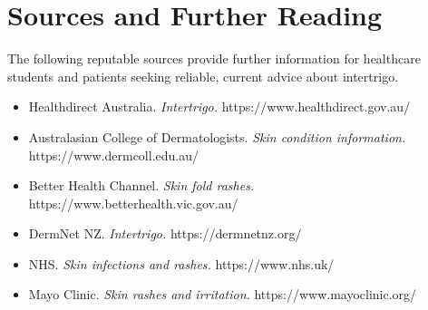 \section*{Sources and Further Reading}
The following reputable sources provide further information for healthcare students and patients seeking reliable, current advice about intertrigo.
\begin{itemize}
    \item Healthdirect Australia. \textit{Intertrigo.} https://www.healthdirect.gov.au/
    \item Australasian College of Dermatologists. \textit{Skin condition information.} https://www.dermcoll.edu.au/
    \item Better Health Channel. \textit{Skin fold rashes.} https://www.betterhealth.vic.gov.au/
    \item DermNet NZ. \textit{Intertrigo.} https://dermnetnz.org/
    \item NHS. \textit{Skin infections and rashes.} https://www.nhs.uk/
    \item Mayo Clinic. \textit{Skin rashes and irritation.} https://www.mayoclinic.org/
\end{itemize}
